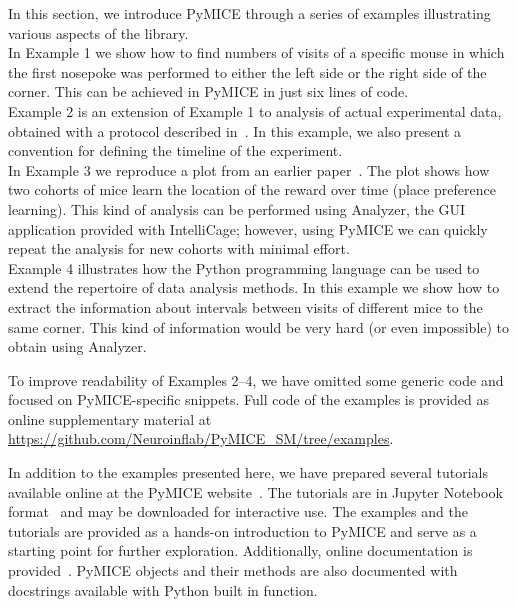 In this section, we introduce PyMICE through a series of examples illustrating various aspects of the library.\\
In Example 1 we show how to find numbers of visits of a specific mouse in which the first nosepoke was performed to either
the left side or the right side of the corner. 
This can be achieved in PyMICE in just six lines of code. \\
Example 2 is an extension of Example 1 to analysis
of actual experimental data, obtained with a protocol described in~\cite{Knapska:2013dj}.
In this example, we also present a convention for
defining the timeline of the experiment. 
\\
In Example 3 we reproduce a plot from an earlier paper~\cite{Puscian:2014cu}.
The plot shows how two cohorts of mice learn the location
of the reward over time (place preference learning). This kind of analysis 
can be performed using Analyzer, the GUI application provided
with IntelliCage; however, using PyMICE we can quickly repeat the analysis for 
new cohorts with minimal effort. \\
Example 4 illustrates how the Python programming language can be used 
to extend the repertoire of data analysis methods.
In this example we show how to extract the information about intervals between visits of different mice to the same corner. 
This kind of information would be very hard (or even impossible) to obtain using Analyzer. 

To improve readability of Examples 2--4, we have omitted some generic code
and focused on PyMICE-specific snippets. Full code of the examples
is provided as online supplementary material at \url{https://github.com/Neuroinflab/PyMICE_SM/tree/examples}.



In addition to the examples presented here, we have prepared several 
tutorials available online at the PyMICE website~\cite{pymiceWebsite}.
The tutorials are in Jupyter Notebook format~\cite{jupyterOrg} and may be downloaded 
for interactive use. 
The examples and the tutorials are provided as a hands-on introduction to
PyMICE and serve as a starting point for further exploration.
Additionally, online documentation is provided~\cite{pymiceDoc}. PyMICE
objects and their methods are also documented with docstrings available with
Python built in  function.
 
